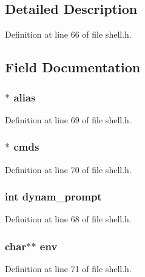\subsection{Detailed Description}


Definition at line 66 of file shell.\-h.



\subsection{Field Documentation}
\subsubsection[{alias}]{$\ast$ alias}\label{structs__data_a605d498106be2e521c13025a71deb7ba}


Definition at line 69 of file shell.\-h.

\subsubsection[{cmds}]{$\ast$ cmds}\label{structs__data_afcffbc0c123dbca7c984b936e58c976b}


Definition at line 70 of file shell.\-h.

\subsubsection[{dynam\-\_\-prompt}]{\setlength{\rightskip}{0pt plus 5cm}int dynam\-\_\-prompt}\label{structs__data_abf3d90c932142f8b97a4757ddec92fb1}


Definition at line 68 of file shell.\-h.

\subsubsection[{env}]{\setlength{\rightskip}{0pt plus 5cm}char$\ast$$\ast$ env}\label{structs__data_a45c1547b79d23d508a01a427c3171ca4}


Definition at line 71 of file shell.\-h.

